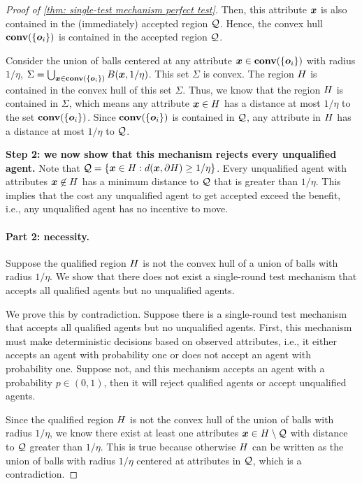 \begin{proof}[Proof of \cref{thm: single-test mechanism perfect test}]
    Then, this attribute $\boldsymbol{x}$ is also contained in the (immediately) accepted region $\mathcal{Q}$. Hence, the convex hull $\textbf{conv}(\{\boldsymbol{o}_i\})$ is contained in the accepted region $\mathcal{Q}$. 
    
    Consider the union of balls centered at any attribute $\boldsymbol{x} \in \textbf{conv}(\{\boldsymbol{o}_i\})$ with radius $1/\eta$, $\Sigma = \bigcup_{\boldsymbol{x} \in \textbf{conv}(\{\boldsymbol{o}_i\})} B(\boldsymbol{x}, 1/\eta)$. This set $\Sigma$ is convex. The region $H$ is contained in the convex hull of this set $\Sigma$. Thus, we know that the region $H$ is contained in $\Sigma$, which means any attribute $\boldsymbol{x} \in H$ has a distance at most $1/\eta$ to the set $\textbf{conv}(\{\boldsymbol{o}_i\})$. Since $\textbf{conv}(\{\boldsymbol{o}_i\})$ is contained in $\mathcal{Q}$, any attribute in $H$ has a distance at most $1/\eta$ to $\mathcal{Q}$.
    
    \textbf{Step 2: we now show that this mechanism rejects every unqualified agent.} Note that $\mathcal{Q} = \{\boldsymbol{x} \in H : d(\boldsymbol{x}, \partial H) \geq 1/\eta\}$. Every unqualified agent with attributes $\boldsymbol{x} \not \in H$ has a  minimum distance to $\mathcal{Q}$ that is greater than $1/\eta$. This implies that the cost any unqualified agent to get accepted exceed the benefit, i.e., any unqualified agent has no incentive to move. 

    \paragraph{Part 2: necessity.} Suppose the qualified region $H$ is not the convex hull of a union of balls with radius $1/\eta$. We show that there does not exist a single-round test mechanism that accepts all qualified agents but no unqualified agents. 

    We prove this by contradiction. Suppose there is a single-round test mechanism that accepts all qualified agents but no unqualified agents. 
    First, this mechanism must make deterministic decisions based on observed attributes, i.e., it either accepts an agent with probability one or does not accept an agent with probability one. Suppose not, and this mechanism accepts an agent with a probability $p \in (0,1)$, then it will reject qualified agents or accept unqualified agents. 

    Since the qualified region $H$ is not the convex hull of the union of balls with radius $1/\eta$, we know there exist at least one attributes $\boldsymbol{x} \in H\setminus \mathcal{Q}$ with distance to $\mathcal{Q}$ greater than $1/\eta$.
    This is true because otherwise $H$ can be written as the union of balls with radius $1/\eta$ centered at attributes in $\mathcal{Q}$, which is a contradiction. 
    

\end{proof}
